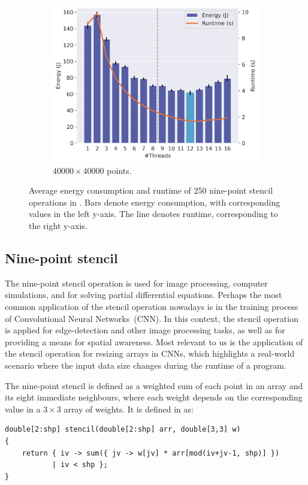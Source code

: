 \begin{figure}[!ht]
\begin{subfigure}{0.33\linewidth}
        \includegraphics[width=\linewidth]{images/stencil_40000.png}
        \caption{$40000 \times 40000$ points.}
        \label{fig:stencil3}
    \end{subfigure}%
    \caption{Average energy consumption and runtime of 250 nine-point stencil operations in \sac{}.
    Bars denote energy consumption, with corresponding values in the left y-axis.
    The line denotes runtime, corresponding to the right y-axis.}
    \label{fig:stencil}
\end{figure}

\subsection{Nine-point stencil}\label{sec:stencil}

The nine-point stencil operation is used for image processing, computer simulations, and for solving
partial differential equations. Perhaps the most common application of the stencil operation
nowadays is in the training process of Convolutional Neural Networks~(CNN). In this context, the
stencil operation is applied for edge-detection and other image processing tasks, as well as for
providing a means for spatial awareness. Most relevant to us is the application of the stencil
operation for resizing arrays in CNNs, which highlights a real-world scenario where the input data
size changes during the runtime of a program.

The nine-point stencil is defined as a weighted sum of each point in an array and its eight
immediate neighbours, where each weight depends on the corresponding value in a $3 \times 3$ array
of weights. It is defined in \sac{} as:
\begin{verbatim}
double[2:shp] stencil(double[2:shp] arr, double[3,3] w)
{
    return { iv -> sum({ jv -> w[jv] * arr[mod(iv+jv-1, shp)] })
           | iv < shp };
}
\end{verbatim}

